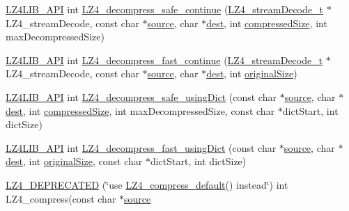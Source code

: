 \begin{DoxyCompactItemize}
\item 
\hyperlink{compat-lz4_8h_a00a61e1435005f8a621edf4bbe0ef844}{L\+Z4\+L\+I\+B\+\_\+\+A\+P\+I} int \hyperlink{compat-lz4_8h_adc92f38c415dad5de8d79512ce025df1}{L\+Z4\+\_\+decompress\+\_\+safe\+\_\+continue} (\hyperlink{compat-lz4_8h_a76a1eaa4729efddb43040217daad4d4e}{L\+Z4\+\_\+stream\+Decode\+\_\+t} $\ast$L\+Z4\+\_\+stream\+Decode, const char $\ast$\hyperlink{compat-lz4_8h_a0211201f992ec3f0b641c9ceff5f837a}{source}, char $\ast$\hyperlink{compat-lz4_8h_accb93c5987f80eedf1f5da3cfa1c0d22}{dest}, int \hyperlink{compat-lz4_8h_a0f9a0600771a3eb50c56e55266a7da49}{compressed\+Size}, int max\+Decompressed\+Size)
\item 
\hyperlink{compat-lz4_8h_a00a61e1435005f8a621edf4bbe0ef844}{L\+Z4\+L\+I\+B\+\_\+\+A\+P\+I} int \hyperlink{compat-lz4_8h_a26fc9946661b00f00f4604baa034e2a6}{L\+Z4\+\_\+decompress\+\_\+fast\+\_\+continue} (\hyperlink{compat-lz4_8h_a76a1eaa4729efddb43040217daad4d4e}{L\+Z4\+\_\+stream\+Decode\+\_\+t} $\ast$L\+Z4\+\_\+stream\+Decode, const char $\ast$\hyperlink{compat-lz4_8h_a0211201f992ec3f0b641c9ceff5f837a}{source}, char $\ast$\hyperlink{compat-lz4_8h_accb93c5987f80eedf1f5da3cfa1c0d22}{dest}, int \hyperlink{compat-lz4_8h_acb72249f2d22c1084adf0de0406d6c3d}{original\+Size})
\item 
\hyperlink{compat-lz4_8h_a00a61e1435005f8a621edf4bbe0ef844}{L\+Z4\+L\+I\+B\+\_\+\+A\+P\+I} int \hyperlink{compat-lz4_8h_a6f859dbaf83e1e76440ba34fa3c80b75}{L\+Z4\+\_\+decompress\+\_\+safe\+\_\+using\+Dict} (const char $\ast$\hyperlink{compat-lz4_8h_a0211201f992ec3f0b641c9ceff5f837a}{source}, char $\ast$\hyperlink{compat-lz4_8h_accb93c5987f80eedf1f5da3cfa1c0d22}{dest}, int \hyperlink{compat-lz4_8h_a0f9a0600771a3eb50c56e55266a7da49}{compressed\+Size}, int max\+Decompressed\+Size, const char $\ast$dict\+Start, int dict\+Size)
\item 
\hyperlink{compat-lz4_8h_a00a61e1435005f8a621edf4bbe0ef844}{L\+Z4\+L\+I\+B\+\_\+\+A\+P\+I} int \hyperlink{compat-lz4_8h_a7f3f35d47e1873d6d29a0d8a1d0a9aa4}{L\+Z4\+\_\+decompress\+\_\+fast\+\_\+using\+Dict} (const char $\ast$\hyperlink{compat-lz4_8h_a0211201f992ec3f0b641c9ceff5f837a}{source}, char $\ast$\hyperlink{compat-lz4_8h_accb93c5987f80eedf1f5da3cfa1c0d22}{dest}, int \hyperlink{compat-lz4_8h_acb72249f2d22c1084adf0de0406d6c3d}{original\+Size}, const char $\ast$dict\+Start, int dict\+Size)
\item 
\hyperlink{compat-lz4_8h_a11e172db85d5940b8c689c0546d6df5a}{L\+Z4\+\_\+\+D\+E\+P\+R\+E\+C\+A\+T\+E\+D} (\char`\"{}use \hyperlink{compat-lz4_8h_a7a99ebb0d007cb52765821274a7a5179}{L\+Z4\+\_\+compress\+\_\+default}() instead\char`\"{}) int L\+Z4\+\_\+compress(const char $\ast$\hyperlink{compat-lz4_8h_a0211201f992ec3f0b641c9ceff5f837a}{source}

\end{DoxyCompactItemize}
